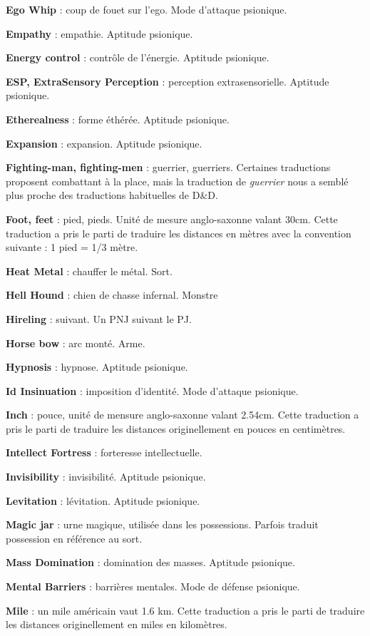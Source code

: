 \documentclass[11pt]{article}
\begin{document}
{\textbf{Ego Whip} : coup de fouet sur l'ego. Mode d'attaque psionique.

\textbf{Empathy} : empathie. Aptitude psionique.

\textbf{Energy control} : contrôle de l'énergie. Aptitude psionique.

\textbf{ESP, ExtraSensory Perception} : perception extrasensorielle. Aptitude psionique.

\textbf{Etherealness} : forme éthérée. Aptitude psionique.

\textbf{Expansion} : expansion. Aptitude psionique.

\textbf{Fighting-man, fighting-men} : guerrier, guerriers. Certaines traductions proposent \og combattant \fg{} à la place, mais la traduction de \textit{guerrier} nous a semblé plus proche des traductions habituelles de D\&D.

\textbf{Foot, feet} : pied, pieds. Unité de mesure anglo-saxonne valant 30cm. Cette traduction a pris le parti de traduire les distances en mètres avec la convention suivante : 1 pied = 1/3 mètre.

\textbf{Heat Metal} : chauffer le métal. Sort.

\textbf{Hell Hound} : chien de chasse infernal. Monstre

\textbf{Hireling} : suivant. Un PNJ suivant le PJ.

\textbf{Horse bow} : arc monté. Arme.

\textbf{Hypnosis} : hypnose. Aptitude psionique.

\textbf{Id Insinuation} : imposition d'identité. Mode d'attaque psionique.

\textbf{Inch} : pouce, unité de mensure anglo-saxonne valant 2.54cm. Cette traduction a pris le parti de traduire les distances originellement en pouces en centimètres.

\textbf{Intellect Fortress} : forteresse intellectuelle.

\textbf{Invisibility} : invisibilité. Aptitude psionique.

\textbf{Levitation} : lévitation. Aptitude psionique.

\textbf{Magic jar} : urne magique, utilisée dans les possessions. Parfois traduit possession en référence au sort.

\textbf{Mass Domination} : domination des masses. Aptitude psionique.

\textbf{Mental Barriers} : barrières mentales. Mode de défense psionique.

\textbf{Mile} : un mile américain vaut 1.6 km. Cette traduction a pris le parti de traduire les distances originellement en miles en kilomètres.

}
\end{document}
